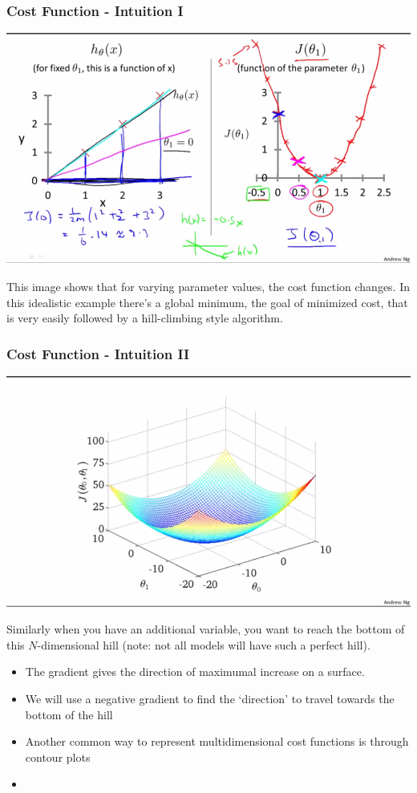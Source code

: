 \subsubsection{Cost Function - Intuition I}
\begin{center}
	\includegraphics[scale=0.75]{sections/cs229/w1/cost_function.png}
\end{center}
This image shows that for varying parameter values, the cost function changes. In this idealistic example there's a global minimum, the goal of minimized cost, that is very easily followed by a hill-climbing style algorithm.

\subsubsection{Cost Function - Intuition II}
\begin{center}
	\includegraphics[scale=0.75]{sections/cs229/w1/2d_cost_function.png}
\end{center}
Similarly when you have an additional variable, you want to reach the bottom of this $N$-dimensional hill (note: not all models will have such a perfect hill). 
\begin{itemize}[--]
	\item The gradient gives the direction of maximumal increase on a surface.
	\item We will use a negative gradient to find the `direction' to travel towards the bottom of the hill
	\item Another common way to represent multidimensional cost functions is through contour plots
	\item 
\end{itemize}